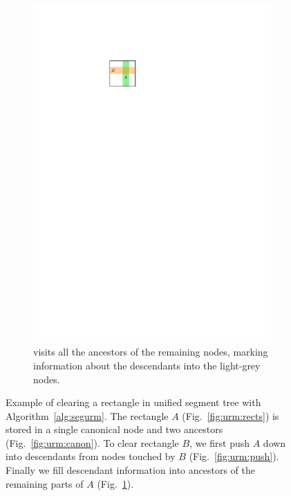 \documentclass[english,gradu]{tktltiki2018}
\begin{document}
\begin{figure}
\begin{subfigure}[t]{0.4\textwidth}
		\includegraphics[width=\textwidth,page=5]{fig/uremove}
		\caption{\recomp visits all the ancestors of the remaining nodes, marking information about the descendants into the light-grey nodes.}\label{fig:urm:recomp}
	\end{subfigure}
	\caption{
	Example of clearing a rectangle in unified segment tree with Algorithm~\ref{alg:segurm}.
	The rectangle $A$ (Fig.~\ref{fig:urm:rects}) is stored in a single canonical node and two ancestors (Fig.~\ref{fig:urm:canon}).
	To clear rectangle $B$, we first push $A$ down into descendants from nodes touched by $B$ (Fig.~\ref{fig:urm:push}).
	Finally we fill descendant information into ancestors of the remaining parts of $A$ (Fig.~\ref{fig:urm:recomp}).
	}\label{fig:uremove}
\end{figure}
\end{document}
